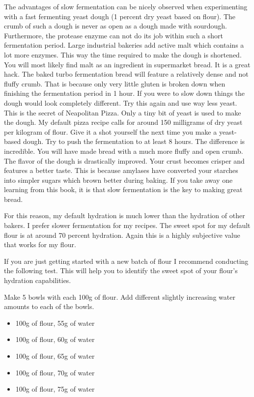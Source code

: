 The advantages of slow fermentation can be nicely observed when experimenting
with a fast fermenting yeast dough (1 percent dry yeast based on flour). The
crumb of such a dough is never as
open as a dough made with sourdough. Furthermore, the protease enzyme
can not do its job within such a short fermentation period.
Large industrial bakeries add active malt which contains a
lot more enzymes. This way the time required to make the dough is shortened. You
will most likely find malt as an ingredient in supermarket bread. It is a
great hack. The baked turbo fermentation bread will feature a relatively dense
and not fluffy crumb. That is because only very little gluten is broken down when
finishing the fermentation period in 1 hour. If you were to slow down things
the dough would look completely different.
Try this again and use way less yeast. This is the
secret of Neapolitan Pizza. Only a tiny bit of yeast is used to make the
dough. My default pizza recipe calls for around 150 milligrams of dry
yeast per kilogram of flour. Give it a shot yourself the next time you
make a yeast-based dough. Try to push the fermentation to at least 8 hours.
The difference is incredible. You will have made bread with a much more
fluffy and open crumb. The flavor of the dough is drastically improved. Your
crust becomes crisper and features a better taste. This is because amylases have
converted your starches into simpler sugars which brown better during baking.
If you take away one learning from this book, it is that slow fermentation is
the key to making great bread.

For this reason, my default hydration is much lower than the hydration of other
bakers. I prefer slower fermentation for my recipes.
The sweet spot for my default flour is at around 70 percent hydration.
Again this is a highly subjective value that works for my flour.

If you are just getting started with a new batch of flour
I recommend conducting the following test. This will help you to
identify the sweet spot of your flour's hydration capabilities.

Make 5 bowls with each 100g of flour. Add different slightly increasing 
water amounts to each of the bowls.

\begin{itemize}
  \item 100g of flour, 55g of water
  \item 100g of flour, 60g of water
  \item 100g of flour, 65g of water
  \item 100g of flour, 70g of water
  \item 100g of flour, 75g of water
\end{itemize}

